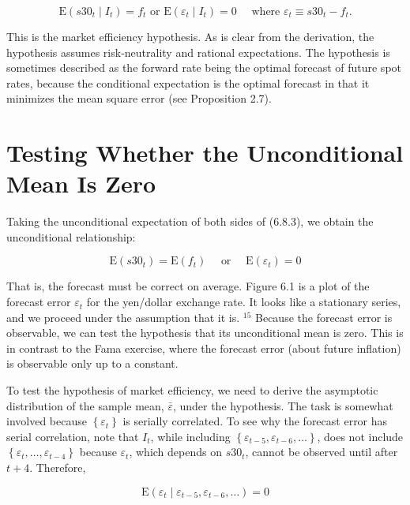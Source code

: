 \documentclass[10pt]{article}
\begin{document}
\begin{equation*}
\mathrm{E}\left(s 30_{t} \mid I_{t}\right)=f_{t} \text { or } \mathrm{E}\left(\varepsilon_{t} \mid I_{t}\right)=0 \quad \text { where } \varepsilon_{t} \equiv s 30_{t}-f_{t} . \tag{6.8.3}
\end{equation*}


This is the market efficiency hypothesis. As is clear from the derivation, the hypothesis assumes risk-neutrality and rational expectations. The hypothesis is sometimes described as the forward rate being the optimal forecast of future spot rates, because the conditional expectation is the optimal forecast in that it minimizes the mean square error (see Proposition 2.7).

\section*{Testing Whether the Unconditional Mean Is Zero}
Taking the unconditional expectation of both sides of (6.8.3), we obtain the unconditional relationship:


\begin{equation*}
\mathrm{E}\left(s 30_{t}\right)=\mathrm{E}\left(f_{t}\right) \quad \text { or } \quad \mathrm{E}\left(\varepsilon_{t}\right)=0 \tag{6.8.4}
\end{equation*}


That is, the forecast must be correct on average. Figure 6.1 is a plot of the forecast error $\varepsilon_{t}$ for the yen/dollar exchange rate. It looks like a stationary series, and we proceed under the assumption that it is. ${ }^{15}$ Because the forecast error is observable, we can test the hypothesis that its unconditional mean is zero. This is in contrast to the Fama exercise, where the forecast error (about future inflation) is observable only up to a constant.

To test the hypothesis of market efficiency, we need to derive the asymptotic distribution of the sample mean, $\bar{\varepsilon}$, under the hypothesis. The task is somewhat involved because $\left\{\varepsilon_{t}\right\}$ is serially correlated. To see why the forecast error has serial correlation, note that $I_{t}$, while including $\left\{\varepsilon_{t-5}, \varepsilon_{t-6}, \ldots\right\}$, does not include $\left\{\varepsilon_{t}, \ldots, \varepsilon_{t-4}\right\}$ because $\varepsilon_{t}$, which depends on $s 30_{t}$, cannot be observed until after $t+4$. Therefore,


\begin{equation*}
\mathrm{E}\left(\varepsilon_{t} \mid \varepsilon_{t-5}, \varepsilon_{t-6}, \ldots\right)=0 \tag{6.8.5}
\end{equation*}
\end{document}
